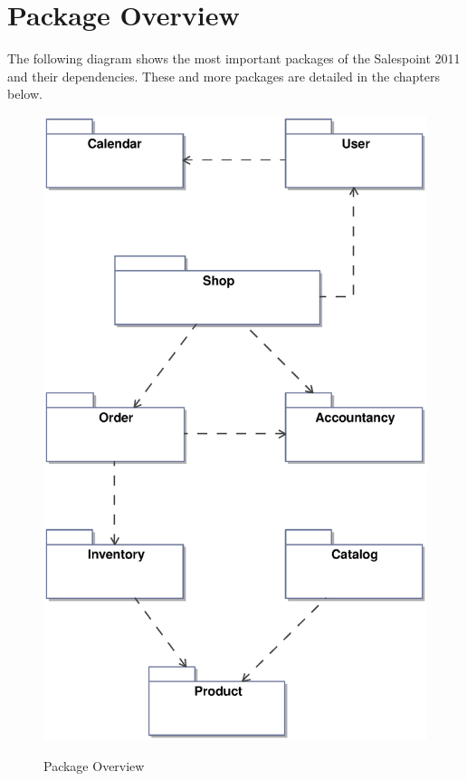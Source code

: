 \section{Package Overview}
The following diagram shows the most important packages of the Salespoint 2011 and their dependencies. These and more packages are detailed in the chapters below.

\vskip 1cm

\begin{figure}[ht]
	\centering
  \includegraphics[scale =.45]{images/Overview_Package.eps}
	\label{package_overview}
	\caption{Package Overview}
\end{figure}